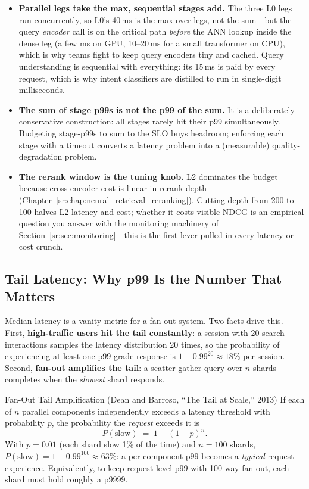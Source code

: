 \begin{itemize}
    \item \textbf{Parallel legs take the max, sequential stages add.} The three L0 legs run concurrently, so L0's 40\,ms is the max over legs, not the sum---but the query \textit{encoder} call is on the critical path \textit{before} the ANN lookup inside the dense leg (a few ms on GPU, 10--20\,ms for a small transformer on CPU), which is why teams fight to keep query encoders tiny and cached. Query understanding is sequential with everything: its 15\,ms is paid by every request, which is why intent classifiers are distilled to run in single-digit milliseconds.
    \item \textbf{The sum of stage p99s is not the p99 of the sum.} It is a deliberately conservative construction: all stages rarely hit their p99 simultaneously. Budgeting stage-p99s to sum to the SLO buys headroom; enforcing each stage with a timeout converts a latency problem into a (measurable) quality-degradation problem.
    \item \textbf{The rerank window is the tuning knob.} L2 dominates the budget because cross-encoder cost is linear in rerank depth (Chapter~\ref{sr:chap:neural_retrieval_reranking}). Cutting depth from 200 to 100 halves L2 latency and cost; whether it costs visible NDCG is an empirical question you answer with the monitoring machinery of Section~\ref{sr:sec:monitoring}---this is the first lever pulled in every latency or cost crunch.
\end{itemize}

\subsection{Tail Latency: Why p99 Is the Number That Matters}

Median latency is a vanity metric for a fan-out system. Two facts drive this. First, \textbf{high-traffic users hit the tail constantly}: a session with 20 search interactions samples the latency distribution 20 times, so the probability of experiencing at least one p99-grade response is $1-0.99^{20} \approx 18\%$ per session. Second, \textbf{fan-out amplifies the tail}: a scatter-gather query over $n$ shards completes when the \textit{slowest} shard responds.

\begin{mathresult}{Fan-Out Tail Amplification (Dean and Barroso, ``The Tail at Scale,'' 2013)}
If each of $n$ parallel components independently exceeds a latency threshold with probability $p$, the probability the \textit{request} exceeds it is
\[
P(\text{slow}) \;=\; 1 - (1-p)^{n}.
\]
With $p = 0.01$ (each shard slow 1\% of the time) and $n = 100$ shards, $P(\text{slow}) = 1 - 0.99^{100} \approx 63\%$: a per-component p99 becomes a \textit{typical} request experience. Equivalently, to keep request-level p99 with 100-way fan-out, each shard must hold roughly a p9999.
\end{mathresult}

